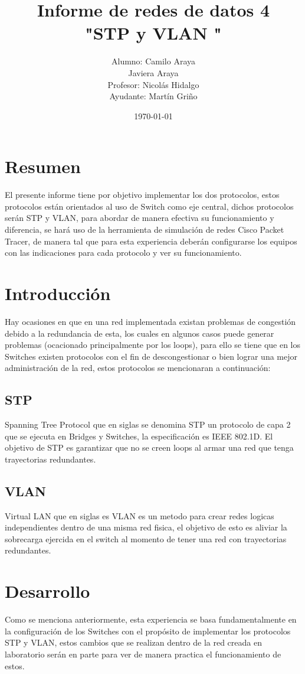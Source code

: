 \documentclass[spanish]{udpreport}
\title{Informe de redes de datos 4\\
"STP y VLAN "\\}
\author{Alumno: Camilo Araya \\ Javiera Araya
\\Profesor: Nicolás Hidalgo\\Ayudante: Martín Griño}
\date{\today}
\begin{document}
\maketitle

\chapter*{Resumen} 
El presente informe tiene por objetivo implementar los dos protocolos, estos protocolos están orientados al uso de Switch como eje central, dichos protocolos serán STP y VLAN, para abordar de manera efectiva su funcionamiento y diferencia, se hará uso de la herramienta de simulación de redes Cisco Packet Tracer, de manera tal que para esta experiencia deberán configurarse los equipos con las indicaciones para cada protocolo y ver su funcionamiento.

\tableofcontents
\chapter{Introducción}
Hay ocasiones en que en una red implementada existan problemas de congestión debido a la redundancia de esta, los cuales en algunos casos puede generar problemas (ocacionado principalmente por los loops), para ello se tiene que en los Switches existen protocolos con el fin de descongestionar o bien lograr una mejor administración de la red, estos protocolos se mencionaran a continuación:
\section{STP}
Spanning Tree Protocol que en siglas se denomina STP un protocolo de capa 2 que se ejecuta en Bridges y Switches, la especificación es IEEE 802.1D. El objetivo de STP es garantizar que no se creen loops al armar una red que tenga trayectorias redundantes.
\section{VLAN}
Virtual LAN que en siglas es VLAN es un metodo para crear redes logicas independientes dentro de una misma red fisica, el objetivo de esto es aliviar la sobrecarga ejercida en el switch al momento de tener una red con trayectorias redundantes.

\chapter{Desarrollo}
Como se menciona anteriormente, esta experiencia se basa fundamentalmente en la configuración de los Switches con el propósito de implementar los protocolos STP y VLAN, estos cambios que se realizan dentro de la red creada en laboratorio serán en parte para ver de manera practica el funcionamiento de estos.
\end{document}
